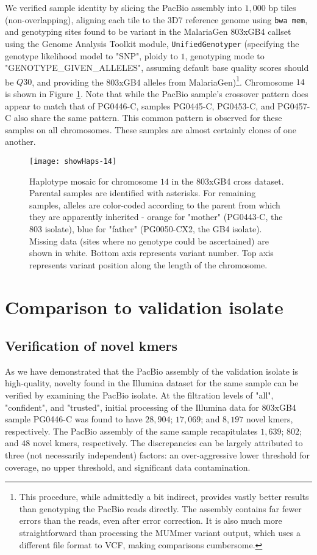We verified sample identity by slicing the PacBio assembly into $1,000$ bp tiles (non-overlapping), aligning each tile to the 3D7 reference genome using \texttt{bwa mem}, and genotyping sites found to be variant in the MalariaGen 803xGB4 callset using the Genome Analysis Toolkit module, \texttt{UnifiedGenotyper} (specifying the genotype likelihood model to "SNP", ploidy to $1$, genotyping mode to "GENOTYPE\_GIVEN\_ALLELES", assuming default base quality scores should be $Q30$, and providing the 803xGB4 alleles from MalariaGen)\footnote{This procedure, while admittedly a bit indirect, provides vastly better results than genotyping the PacBio reads directly.  The assembly contains far fewer errors than the reads, even after error correction.  It is also much more straightforward than processing the MUMmer variant output, which uses a different file format to VCF, making comparisons cumbersome.}.  Chromosome $14$ is shown in Figure \ref{fig:showHaps}.  Note that while the PacBio sample's crossover pattern does appear to match that of PG0446-C, samples PG0445-C, PG0453-C, and PG0457-C also share the same pattern.  This common pattern is observed for these samples on all chromosomes.  These samples are almost certainly clones of one another.

\begin{figure}[h!]
  \centering
    \texttt{[image: showHaps-14]}
  \caption{Haplotype mosaic for chromosome $14$ in the 803xGB4 cross dataset.  Parental samples are identified with asterisks.  For remaining samples, alleles are color-coded according to the parent from which they are apparently inherited - orange for "mother" (PG0443-C, the 803 isolate), blue for "father" (PG0050-CX2, the GB4 isolate).  Missing data (sites where no genotype could be ascertained) are shown in white.  Bottom axis represents variant number.  Top axis represents variant position along the length of the chromosome.}
  \label{fig:showHaps}
\end{figure}

\section{Comparison to validation isolate}

\subsection{Verification of novel kmers}

As we have demonstrated that the PacBio assembly of the validation isolate is high-quality, novelty found in the Illumina dataset for the same sample can be verified by examining the PacBio isolate.  At the filtration levels of "all", "confident", and "trusted", initial processing of the Illumina data for 803xGB4 sample PG0446-C was found to have $28,904$; $17,069$; and $8,197$ novel kmers, respectively.  The PacBio assembly of the same sample recapitulates $1,639$; $802$; and $48$ novel kmers, respectively.  The discrepancies can be largely attributed to three (not necessarily independent) factors: an over-aggressive lower threshold for coverage, no upper threshold, and significant data contamination.


